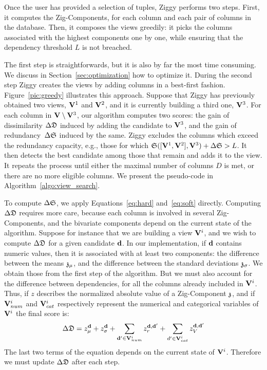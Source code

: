 Once the user has provided a selection of tuples, Ziggy performs two steps.
First, it computes the Zig-Components, for each column and each pair of columns
in the database. Then, it composes the views greedily: it picks the
co\-lumns associated with the highest components one by one, while ensuring
that the dependency threshold $L$ is not breached.

The first step is straightforwards, but it is also by far the most time
consuming. We discuss in Section~\ref{sec:optimization} how to optimize it.
During the second step Ziggy creates the views by adding columns in a
best-first fashion.  Figure~\ref{pic:greedy} illustrates this approach. Suppose
that Ziggy has previously obtained two views, $\mathbf{V}^1$ and $\mathbf{V}^2$, and it
is currently building a third one, $\mathbf{V}^3$. For each column in $\mathbf{V}
\setminus \mathbf{V}^3 $, our algorithm computes two scores: the gain of
dissimilarity $\Delta\mathfrak{D}$ induced by adding the candidate to $\mathbf{V}^3$, and
the gain of redundancy~$\Delta\mathfrak{S}$ induced by the same. Ziggy excludes the
columns which exceed the redundancy capacity, e.g., those for which
$\mathfrak{S}([\mathbf{V}^1, \mathbf{V}^2], \mathbf{V}^3) + \Delta\mathfrak{S} > L$. It then detects
the best candidate among those that remain and adds it to the view. It repeats the
process until either the maximal number of columns $D$ is met, or there are no
more eligible columns. We present the pseudo-code in
Algorithm~\ref{algo:view_search}.

To compute $\Delta\mathfrak{S}$, we apply Equations~\ref{eq:hard} and~\ref{eq:soft}
directly. Computing $\Delta\mathfrak{D}$ requires more care, because each column is
involved in several Zig-Com\-po\-nents, and the bivariate components
depend on the current state of the algorithm.  Suppose for instance that we are
building a view $\mathbf{V}^{i}$, and we wish to compute $\Delta\mathfrak{D}$ for a given
candidate $\bf{d}$.  In our implementation, if $\bf{d}$ contains numeric
values, then it is associated with at least two components: the difference
between the means $\mathfrak{z}_\mu$, and the difference between the standard
deviations $\mathfrak{z}_\sigma$. We obtain those from the first step of the
algorithm.  But we must also account for the difference between dependencies,
for all the columns already included in $\mathbf{V}^{i}$. Thus, if $z$ describes
the normalized absolute value of a Zig-Component $\mathfrak{z}$, and if
$\mathbf{V}^{i}_{num}$ and $\mathbf{V}^{i}_{cat}$ respectively represent the numerical
and categorical variables of $\mathbf{V}^{i}$ the final score is:
    \begin{multline}
\Delta\mathfrak{D} = 
z_\mu^{\bf{d}}+ z_\sigma^{\bf{d}} +
\sum_{\mathbf{d}' \in \mathbf{V}^i_{num}} z_r^{\mathbf{d}, \mathbf{d}'}
+ \sum_{d' \in \mathbf{V}^i_{cat}} z_V^{\mathbf{d}, \mathbf{d}'}
\end{multline}
The last two terms of the equation depends on the current state of $ \mathbf{V}^i$.
Therefore we must update $\Delta\mathfrak{D}$ after each step.

